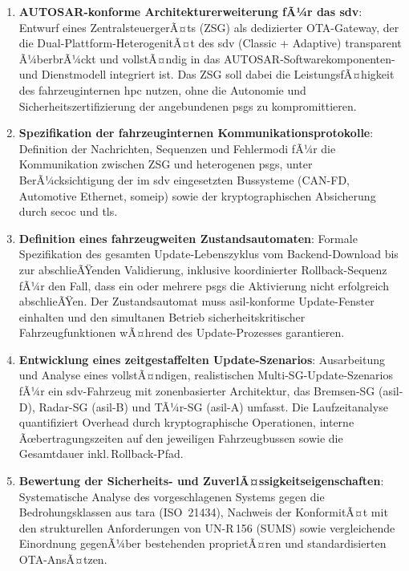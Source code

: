 ﻿\documentclass[12pt,a4paper,twoside]{article}
\begin{document}
\begin{enumerate}[leftmargin=*]
  \item \textbf{AUTOSAR-konforme Architekturerweiterung fÃ¼r das \gls{sdv}}:
    Entwurf eines ZentralsteuergerÃ¤ts (ZSG) als dedizierter OTA-Gateway,
    der die Dual-Plattform-HeterogenitÃ¤t des \gls{sdv} (Classic + Adaptive)
    transparent Ã¼berbrÃ¼ckt und vollstÃ¤ndig in das AUTOSAR-Softwarekomponenten-
    und Dienstmodell integriert ist. Das ZSG soll dabei die
    LeistungsfÃ¤higkeit des fahrzeuginternen \gls{hpc} nutzen, ohne
    die Autonomie und Sicherheitszertifizierung der angebundenen
    \glspl{psg} zu kompromittieren.

  \item \textbf{Spezifikation der fahrzeuginternen Kommunikationsprotokolle}:
    Definition der Nachrichten, Sequenzen und Fehlermodi fÃ¼r die
    Kommunikation zwischen ZSG und heterogenen \glspl{psg}, unter
    BerÃ¼cksichtigung der im \gls{sdv} eingesetzten Bussysteme
    (CAN-FD, Automotive Ethernet, \gls{someip}) sowie der
    kryptographischen Absicherung durch \gls{secoc} und \gls{tls}.

  \item \textbf{Definition eines fahrzeugweiten Zustandsautomaten}:
    Formale Spezifikation des gesamten Update-Lebenszyklus vom
    Backend-Download bis zur abschlieÃŸenden Validierung, inklusive
    koordinierter Rollback-Sequenz fÃ¼r den Fall, dass ein oder
    mehrere \glspl{psg} die Aktivierung nicht erfolgreich abschlieÃŸen.
    Der Zustandsautomat muss \gls{asil}-konforme Update-Fenster
    einhalten und den simultanen Betrieb sicherheitskritischer
    Fahrzeugfunktionen wÃ¤hrend des Update-Prozesses garantieren.

  \item \textbf{Entwicklung eines zeitgestaffelten Update-Szenarios}:
    Ausarbeitung und Analyse eines vollstÃ¤ndigen, realistischen
    Multi-SG-Update-Szenarios fÃ¼r ein \gls{sdv}-Fahrzeug mit
    zonenbasierter Architektur, das Bremsen-SG (\gls{asil}-D),
    Radar-SG (\gls{asil}-B) und TÃ¼r-SG (\gls{asil}-A) umfasst.
    Die Laufzeitanalyse quantifiziert Overhead durch kryptographische
    Operationen, interne Ãœbertragungszeiten auf den jeweiligen
    Fahrzeugbussen sowie die Gesamtdauer inkl.\,Rollback-Pfad.

  \item \textbf{Bewertung der Sicherheits- und ZuverlÃ¤ssigkeitseigenschaften}:
    Systematische Analyse des vorgeschlagenen Systems gegen die
    Bedrohungsklassen aus \gls{tara} (ISO~21434), Nachweis der
    KonformitÃ¤t mit den strukturellen Anforderungen von
    UN-R\,156 (SUMS) sowie vergleichende Einordnung gegenÃ¼ber
    bestehenden proprietÃ¤ren und standardisierten OTA-AnsÃ¤tzen.
\end{enumerate}
\end{document}
